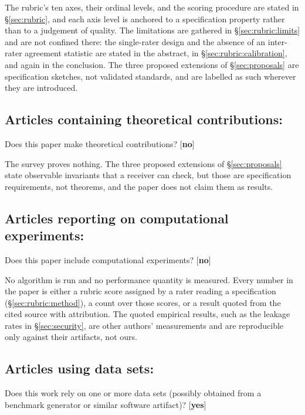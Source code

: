 \noindent The rubric's ten axes, their ordinal levels, and the scoring
procedure are stated in \S\ref{sec:rubric}, and each axis level is anchored to
a specification property rather than to a judgement of quality. The
limitations are gathered in \S\ref{sec:rubric:limits} and are not confined
there: the single-rater design and the absence of an inter-rater agreement
statistic are stated in the abstract, in \S\ref{sec:rubric:calibration}, and
again in the conclusion. The three proposed extensions of
\S\ref{sec:proposals} are specification sketches, not validated standards,
and are labelled as such wherever they are introduced.

\subsection*{Articles containing theoretical contributions:}
Does this paper make theoretical contributions?
[\textbf{no}]

\noindent The survey proves nothing. The three proposed extensions of
\S\ref{sec:proposals} state observable invariants that a receiver can check,
but those are specification requirements, not theorems, and the paper does
not claim them as results.

\subsection*{Articles reporting on computational experiments:}
Does this paper include computational experiments? [\textbf{no}]

\noindent No algorithm is run and no performance quantity is measured. Every
number in the paper is either a rubric score assigned by a rater reading a
specification (\S\ref{sec:rubric:method}), a count over those scores, or a
result quoted from the cited source with attribution. The quoted empirical
results, such as the leakage rates in \S\ref{sec:security}, are other
authors' measurements and are reproducible only against their artifacts, not
ours.

\subsection*{Articles using data sets:}
Does this work rely on one or more data sets (possibly obtained from a
benchmark generator or similar software artifact)?
[\textbf{yes}]

